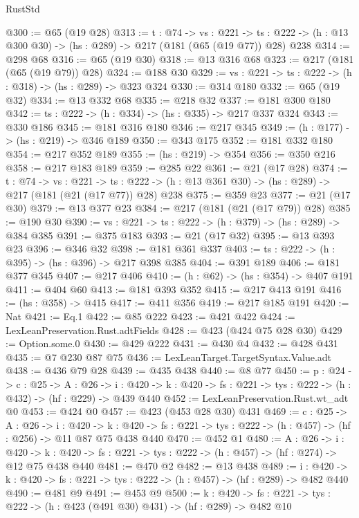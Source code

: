 \begin{lexlean}{RustStd}
\begin{coremodule}
{\begin{coremodule}
{{{@300 := @65 (@19 @28)
@313 := {t : @74} ->
  {vs : @221} ->
  {ts : @222} -> (h : @13 @300 @30) -> (hs : @289) -> @217 (@181 (@65 (@19 @77)) @28) @238
@314 := @298 @68
@316 := @65 (@19 @30)
@318 := @13 @316 @68
@323 := @217 (@181 (@65 (@19 @79)) @28)
@324 := @188 @30
@329 := {vs : @221} -> {ts : @222} -> (h : @318) -> (hs : @289) -> @323 @324
@330 := @314 @180
@332 := @65 (@19 @32)
@334 := @13 @332 @68
@335 := @218 @32
@337 := @181 @300 @180
@342 := {ts : @222} -> (h : @334) -> (hs : @335) -> @217 @337 @324
@343 := @330 @186
@345 := @181 @316 @180
@346 := @217 @345
@349 := (h : @177) -> (hs : @219) -> @346 @189
@350 := @343 @175
@352 := @181 @332 @180
@354 := @217 @352 @189
@355 := (hs : @219) -> @354
@356 := @350 @216
@358 := @217 @183 @189
@359 := @285 @22
@361 := @21 (@17 @28)
@374 := {t : @74} ->
  {vs : @221} ->
  {ts : @222} -> (h : @13 @361 @30) -> (hs : @289) -> @217 (@181 (@21 (@17 @77)) @28) @238
@375 := @359 @23
@377 := @21 (@17 @30)
@379 := @13 @377 @23
@384 := @217 (@181 (@21 (@17 @79)) @28)
@385 := @190 @30
@390 := {vs : @221} -> {ts : @222} -> (h : @379) -> (hs : @289) -> @384 @385
@391 := @375 @183
@393 := @21 (@17 @32)
@395 := @13 @393 @23
@396 := @346 @32
@398 := @181 @361 @337
@403 := {ts : @222} -> (h : @395) -> (hs : @396) -> @217 @398 @385
@404 := @391 @189
@406 := @181 @377 @345
@407 := @217 @406
@410 := (h : @62) -> (hs : @354) -> @407 @191
@411 := @404 @60
@413 := @181 @393 @352
@415 := @217 @413 @191
@416 := (hs : @358) -> @415
@417 := @411 @356
@419 := @217 @185 @191
@420 := Nat
@421 := Eq.{1}
@422 := @85 @222
@423 := @421 @422
@424 := LexLeanPreservation.Rust.adtFields
@428 := @423 (@424 @75 @28 @30)
@429 := Option.some.{0}
@430 := @429 @222
@431 := @430 @4
@432 := @428 @431
@435 := @7 @230 @87 @75
@436 := LexLeanTarget.TargetSyntax.Value.adt
@438 := @436 @79 @28
@439 := @435 @438
@440 := @8 @77
@450 := {p : @24} ->
  {c : @25} ->
  {A : @26} ->
  {i : @420} -> {k : @420} -> {fs : @221} -> {tys : @222} -> (h : @432) -> (hf : @229) -> @439 @440
@452 := LexLeanPreservation.Rust.wt_adt @0
@453 := @424 @0
@457 := @423 (@453 @28 @30) @431
@469 := {c : @25} ->
  {A : @26} ->
  {i : @420} ->
  {k : @420} -> {fs : @221} -> {tys : @222} -> (h : @457) -> (hf : @256) -> @11 @87 @75 @438 @440
@470 := @452 @1
@480 := {A : @26} ->
  {i : @420} ->
  {k : @420} -> {fs : @221} -> {tys : @222} -> (h : @457) -> (hf : @274) -> @12 @75 @438 @440
@481 := @470 @2
@482 := @13 @438
@489 := {i : @420} ->
  {k : @420} -> {fs : @221} -> {tys : @222} -> (h : @457) -> (hf : @289) -> @482 @440
@490 := @481 @9
@491 := @453 @9
@500 := {k : @420} ->
  {fs : @221} -> {tys : @222} -> (h : @423 (@491 @30) @431) -> (hf : @289) -> @482 @10
}}}
\end{coremodule}}
\end{coremodule}
\end{lexlean}
